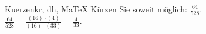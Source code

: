 \begin{MAufgabe}{Kuerzen}{kr, dh, MaTeX}
K\"urzen Sie soweit m\"oglich: $\frac{64}{528}$.\\ 
\ifLsg\MLoesung
\quad $\frac{64}{528}=\frac{(16)\cdot(4)}{(16)\cdot(33)}=\frac{4}{33}$.\else\relax\fi
 \end{MAufgabe}